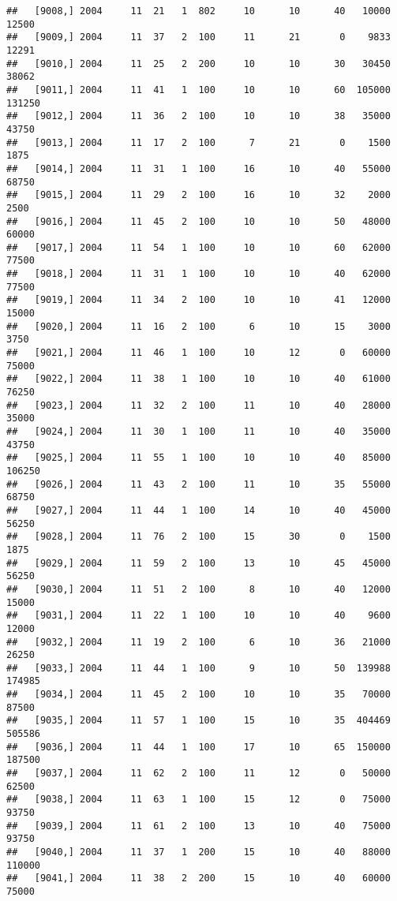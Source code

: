 \documentclass{article}\usepackage[]{graphicx}\usepackage[]{color}
\makeatletter
\newenvironment{kframe}{%
 \def\at@end@of@kframe{}%
 \ifinner\ifhmode%
  \def\at@end@of@kframe{\end{minipage}}%
  \begin{minipage}{\columnwidth}%
 \fi\fi%
 \def\FrameCommand##1{\hskip\@totalleftmargin \hskip-\fboxsep
 \colorbox{shadecolor}{##1}\hskip-\fboxsep
     \hskip-\linewidth \hskip-\@totalleftmargin \hskip\columnwidth}%
 \MakeFramed {\advance\hsize-\width
   \@totalleftmargin\z@ \linewidth\hsize
   \@setminipage}}%
 {\par\unskip\endMakeFramed%
 \at@end@of@kframe}
\newenvironment{knitrout}{}{} %
\makeatother
\begin{document}
\begin{knitrout}
\begin{kframe}
\begin{verbatim}
##   [9008,] 2004     11  21   1  802     10      10      40   10000   12500
##   [9009,] 2004     11  37   2  100     11      21       0    9833   12291
##   [9010,] 2004     11  25   2  200     10      10      30   30450   38062
##   [9011,] 2004     11  41   1  100     10      10      60  105000  131250
##   [9012,] 2004     11  36   2  100     10      10      38   35000   43750
##   [9013,] 2004     11  17   2  100      7      21       0    1500    1875
##   [9014,] 2004     11  31   1  100     16      10      40   55000   68750
##   [9015,] 2004     11  29   2  100     16      10      32    2000    2500
##   [9016,] 2004     11  45   2  100     10      10      50   48000   60000
##   [9017,] 2004     11  54   1  100     10      10      60   62000   77500
##   [9018,] 2004     11  31   1  100     10      10      40   62000   77500
##   [9019,] 2004     11  34   2  100     10      10      41   12000   15000
##   [9020,] 2004     11  16   2  100      6      10      15    3000    3750
##   [9021,] 2004     11  46   1  100     10      12       0   60000   75000
##   [9022,] 2004     11  38   1  100     10      10      40   61000   76250
##   [9023,] 2004     11  32   2  100     11      10      40   28000   35000
##   [9024,] 2004     11  30   1  100     11      10      40   35000   43750
##   [9025,] 2004     11  55   1  100     10      10      40   85000  106250
##   [9026,] 2004     11  43   2  100     11      10      35   55000   68750
##   [9027,] 2004     11  44   1  100     14      10      40   45000   56250
##   [9028,] 2004     11  76   2  100     15      30       0    1500    1875
##   [9029,] 2004     11  59   2  100     13      10      45   45000   56250
##   [9030,] 2004     11  51   2  100      8      10      40   12000   15000
##   [9031,] 2004     11  22   1  100     10      10      40    9600   12000
##   [9032,] 2004     11  19   2  100      6      10      36   21000   26250
##   [9033,] 2004     11  44   1  100      9      10      50  139988  174985
##   [9034,] 2004     11  45   2  100     10      10      35   70000   87500
##   [9035,] 2004     11  57   1  100     15      10      35  404469  505586
##   [9036,] 2004     11  44   1  100     17      10      65  150000  187500
##   [9037,] 2004     11  62   2  100     11      12       0   50000   62500
##   [9038,] 2004     11  63   1  100     15      12       0   75000   93750
##   [9039,] 2004     11  61   2  100     13      10      40   75000   93750
##   [9040,] 2004     11  37   1  200     15      10      40   88000  110000
##   [9041,] 2004     11  38   2  200     15      10      40   60000   75000

\end{verbatim}
\end{kframe}
\end{knitrout}
\end{document}
